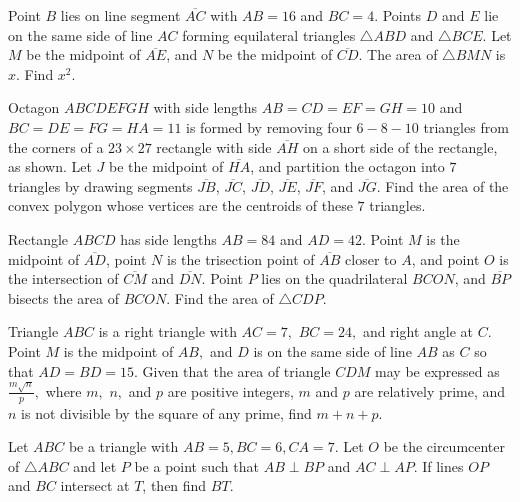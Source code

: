 \documentclass{article}
\begin{document}
\begin{prob}[AIME I 2015/4]{4}
Point $B$ lies on line segment $\overline{AC}$ with $AB=16$ and $BC=4$. Points $D$ and $E$ lie on the same side of line $AC$ forming equilateral triangles $\triangle ABD$ and $\triangle BCE$. Let $M$ be the midpoint of $\overline{AE}$, and $N$ be the midpoint of $\overline{CD}$. The area of $\triangle BMN$ is $x$. Find $x^2$.
\end{prob}

\begin{prob}[AIME II 2018/9]{6}
Octagon $ABCDEFGH$ with side lengths $AB = CD = EF = GH = 10$ and $BC=  DE = FG = HA = 11$ is formed by removing four $6-8-10$ triangles from the corners of a $23\times 27$ rectangle with side $\overline{AH}$ on a short side of the rectangle, as shown. Let $J$ be the midpoint of $\overline{HA}$, and partition the octagon into $7$ triangles by drawing segments $\overline{JB}$, $\overline{JC}$, $\overline{JD}$, $\overline{JE}$, $\overline{JF}$, and $\overline{JG}$. Find the area of the convex polygon whose vertices are the centroids of these $7$ triangles.
\begin{center}
    
\end{center}
\end{prob}

\begin{prob}[AIME II 2017/10]{6}
Rectangle $ABCD$ has side lengths $AB=84$ and $AD=42$. Point $M$ is the midpoint of $\overline{AD}$, point $N$ is the trisection point of $\overline{AB}$ closer to $A$, and point $O$ is the intersection of $\overline{CM}$ and $\overline{DN}$. Point $P$ lies on the quadrilateral $BCON$, and $\overline{BP}$ bisects the area of $BCON$. Find the area of $\triangle CDP$.
\end{prob}

\begin{prob}[AIME II 2003/11]{6}
Triangle $ABC$ is a right triangle with $AC=7,$ $BC=24,$ and right angle at $C.$ Point $M$ is the midpoint of $AB,$ and $D$ is on the same side of line $AB$ as $C$ so that $AD=BD=15.$ Given that the area of triangle $CDM$ may be expressed as $\frac{m\sqrt{n}}{p},$ where $m,$ $n,$ and $p$ are positive integers, $m$ and $p$ are relatively prime, and $n$ is not divisible by the square of any prime, find $m+n+p.$
\end{prob}

\begin{prob}[CIME II 2021/12]{9}
Let $ABC$ be a triangle with $AB = 5, BC = 6, CA = 7$. Let $O$ be the circumcenter of $\triangle ABC$ and let $P$ be a point such that $AB \perp BP$ and $AC \perp AP$. If lines $OP$ and $BC$ intersect at $T$, then find $BT$.
\end{prob}
\end{document}
